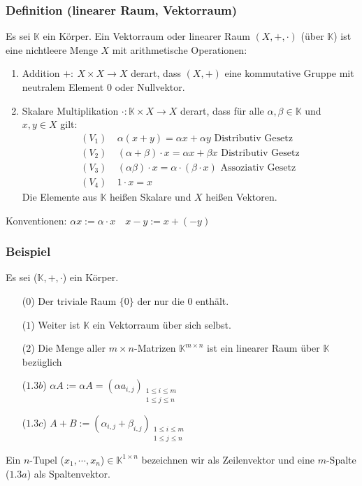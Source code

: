 \subsubsection{Definition (linearer Raum, Vektorraum)}
\label{Vektorraum}
Es sei $\mathbb{K}$ ein Körper.  Ein Vektorraum oder linearer Raum $(X,+,\cdot )$ (über $\mathbb{K}$) ist eine nichtleere Menge $X$ mit arithmetische Operationen:
\begin{enumerate}
\item Addition $+:\ X\times X\rightarrow X$ derart, dass $(X,+)$ eine kommutative Gruppe mit neutralem Element $0$ oder Nullvektor.
\item Skalare Multiplikation $\cdot :\mathbb{K}\times X\rightarrow X$ derart, dass für alle $\alpha ,\beta \in \mathbb{K}$ und $x,y\in X$ gilt:
\begin{align*}
(V_1)&\ \alpha (x+y) = \alpha x+\alpha y \text{ Distributiv Gesetz}\\
(V_2)&\ (\alpha +\beta ) \cdot x = \alpha x + \beta x \text{ Distributiv Gesetz} \\
(V_3)&\ (\alpha\beta )\cdot x = \alpha \cdot (\beta \cdot x) \text{ Assoziativ Gesetz}\\
(V_4)&\ 1\cdot x = x
\end{align*}
Die Elemente aus $\mathbb{K}$ heißen Skalare und $X$ heißen Vektoren.
\end{enumerate}
Konventionen: $\alpha x := \alpha\cdot x \quad x-y:=x+(-y)$
\subsubsection{Beispiel}
Es sei ($\mathbb{K},+,\cdot $) ein Körper.
\begin{enumerate}
\item[($0$)] Der triviale Raum $\{0\}$ der nur die $0$ enthält.
\item[($1$)] Weiter ist $\mathbb{K}$ ein Vektorraum über sich selbst.
\item[($2$)] Die Menge aller $m\times n$-Matrizen $\mathbb{K}^{m\times n}$ ist ein linearer Raum über $\mathbb{K}$ bezüglich
\item[($1.3b$)] $\alpha A := \alpha A = (\alpha a_{i,j})_{\substack{1\leq i\leq m\\1\leq j\leq n}}$
\item[($1.3c$)] $A+B := (\alpha _{i,j}+\beta _{i,j})_{\substack{1\leq i\leq m\\1\leq j\leq n}}$
\end{enumerate}
Ein $n$-Tupel ($x_1,\cdots ,x_n$)$\in \mathbb{K}^{1\times n}$ bezeichnen wir als Zeilenvektor und eine $m$-Spalte ($1.3a$) als Spaltenvektor.
